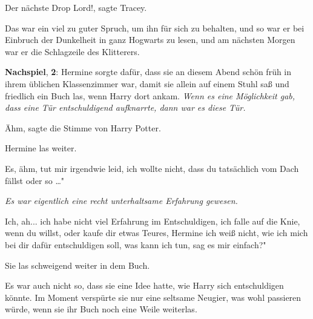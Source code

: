 \glqq{}Der nächste Drop Lord!\grqq{}, sagte Tracey.

Das war ein viel zu guter Spruch, um ihn für sich zu behalten, und so war er bei
Einbruch der Dunkelheit in ganz Hogwarts zu lesen, und am nächsten Morgen war er
die Schlagzeile des Klitterers.

\textbf{Nachspiel}, \textbf{2}: Hermine sorgte dafür, dass sie an diesem Abend
schön früh in ihrem üblichen Klassenzimmer war, damit sie allein auf einem Stuhl
saß und friedlich ein Buch las, wenn Harry dort ankam.
\emph{Wenn es eine Möglichkeit gab, dass eine Tür entschuldigend aufknarrte,
dann war es diese Tür.}

\glqq{}Ähm\grqq{}, sagte die Stimme von Harry Potter.

Hermine las weiter.

\glqq{}Es, ähm, tut mir irgendwie leid, ich wollte nicht, dass du tatsächlich vom
Dach fällst oder so …"

\emph{Es war eigentlich eine recht unterhaltsame Erfahrung gewesen.}

\glqq{}Ich, ah... ich habe nicht viel Erfahrung im Entschuldigen, ich falle auf
die Knie, wenn du willst, oder kaufe dir etwas Teures, Hermine ich weiß nicht,
wie ich mich bei dir dafür entschuldigen soll, was kann ich tun, sag es mir
einfach?"

Sie las schweigend weiter in dem Buch.

Es war auch nicht so, dass sie eine Idee hatte, wie Harry sich entschuldigen
könnte. Im Moment verspürte sie nur eine seltsame Neugier, was wohl passieren
würde, wenn sie ihr Buch noch eine Weile weiterlas.

